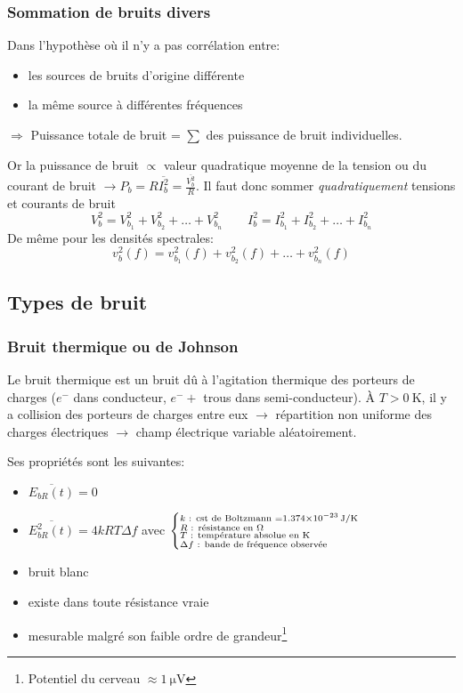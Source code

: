 \subsubsection{Sommation de bruits divers}
Dans l'hypothèse où il n'y a pas corrélation entre:
\begin{itemize}
	\item les sources de bruits d'origine différente
	\item la même source à différentes fréquences
\end{itemize}
\centerline{\(\Rightarrow\) Puissance totale de bruit = \(\sum\) des puissance de bruit individuelles.}
Or la puissance de bruit \(\propto\) valeur quadratique moyenne de la tension ou du courant de bruit \(\rightarrow P_b=R \overline{I^2_b} = \frac{\overline{V_b^2}}{R}\). Il faut donc sommer \emph{quadratiquement} tensions et courants de bruit 
\[
V_b^2 = V_{b_1}^2 + V_{b_2}^2 + \dots + V_{b_n}^2 \qquad I_b^2 = I_{b_1}^2 + I_{b_2}^2 + \dots + I_{b_n}^2
\]
De même pour les densités spectrales:
\[
v_b^2(f) = v_{b_1}^2(f) + v_{b_2}^2(f) + \dots + v_{b_n}^2(f)
\]
\subsection{Types de bruit}
\subsubsection{Bruit thermique ou de Johnson}
Le bruit thermique est un bruit dû à l'agitation thermique des porteurs de charges (\(e^-\) dans conducteur, \(e^-+\) trous dans semi-conducteur). À \(T>\SI{0}{\kelvin}\), il y a collision des porteurs de charges entre eux \(\rightarrow\) répartition non uniforme des charges électriques \(\rightarrow\) champ électrique variable aléatoirement.\bigbreak

Ses propriétés sont les suivantes:
\begin{itemize}
	\item { \(\overline{E_{bR}(t)}=0\)} 
	\item { \(\overline{E^2_{bR}(t)}=4kRT\Delta f\)} avec \(\left\{\substack{k\text{ : cst de Boltzmann }=\SI[per-mode=symbol]{1.374e-23}{\joule\per\kelvin}\\
	R \text{ : résistance en }\si{\ohm}\hfill \\
	T\text{ : température absolue en }\si{\kelvin}\hfill\\
	\Delta f\text{ : bande de fréquence observée}\hfill}\right.\)
	\item bruit blanc
	\item existe dans toute résistance vraie
	\item mesurable malgré son faible ordre de grandeur\footnote{Potentiel du cerveau \(\approx \SI{1}{\micro\volt}\)}
\end{itemize}
